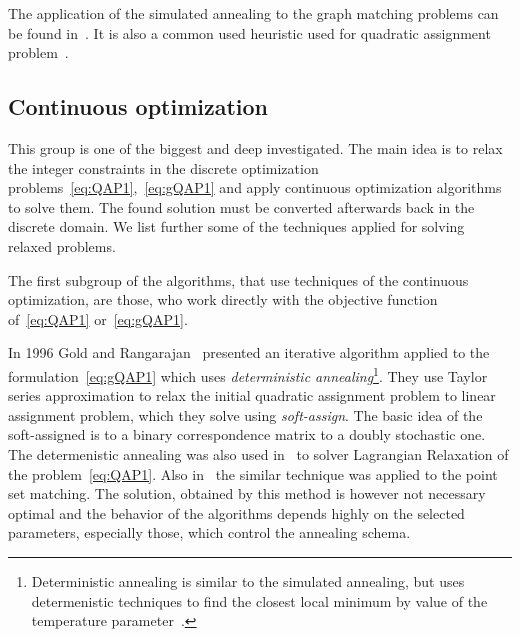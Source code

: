 The application of the simulated annealing to the graph matching problems can be found in~\cite{Herault1990_SimulatedAnnealing}. It is also a common used heuristic used for quadratic assignment problem~\cite{Burkard98thequadratic}.

\subsection{Continuous optimization}
This group is one of the biggest and deep investigated. The main idea is to relax the integer constraints in the discrete optimization problems~\eqref{eq:QAP1},~\eqref{eq:gQAP1} and apply continuous optimization algorithms to solve them. The found solution must be converted afterwards back in the discrete domain. We list further some of the techniques applied for solving relaxed problems.

The first subgroup of the algorithms, that use techniques of the continuous optimization, are those, who work directly with the objective function of~\eqref{eq:QAP1} or~\eqref{eq:gQAP1}.

In 1996 Gold and Rangarajan~\cite{Rangarajan1996_GAGM} presented an iterative algorithm applied to the formulation~\eqref{eq:gQAP1} which uses \emph{deterministic annealing}\footnote{Deterministic annealing is similar to the simulated annealing, but uses determenistic techniques to find the closest local minimum by value of the temperature parameter~\cite{Rose1991_DA}.}. They use Taylor series approximation to relax the initial quadratic assignment problem to linear assignment problem, which they solve using \emph{soft-assign}. The basic idea of the soft-assigned is to a binary correspondence matrix to a doubly stochastic one. The determenistic annealing was also used in~\cite{Rangarajan96_LagRelax} to solver Lagrangian Relaxation of the problem~\eqref{eq:QAP1}.  Also in~\cite{Chui2003} the similar technique was applied to the point set matching. The solution, obtained by this method is however not necessary optimal and the behavior of the algorithms depends highly on the selected parameters, especially those, which control the annealing schema.

